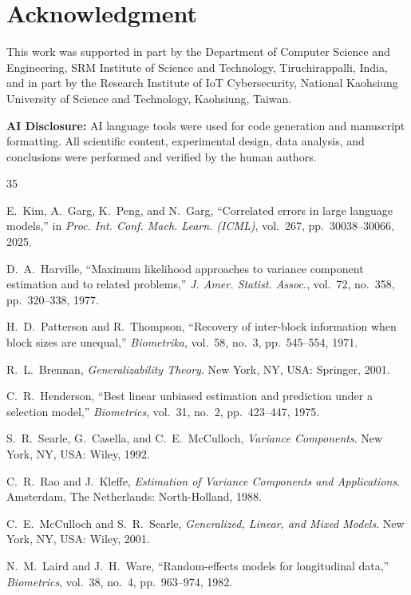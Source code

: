 \documentclass{ieeeaccess}
\theoremstyle{definition}
\theoremstyle{plain}
\begin{document}
\section*{Acknowledgment}
This work was supported in part by the Department of Computer Science and Engineering, SRM Institute of Science and Technology, Tiruchirappalli, India, and in part by the Research Institute of IoT Cybersecurity, National Kaohsiung University of Science and Technology, Kaohsiung, Taiwan.

\textbf{AI Disclosure:} AI language tools were used for code generation and manuscript formatting. All scientific content, experimental design, data analysis, and conclusions were performed and verified by the human authors.

\begin{thebibliography}{35}

 E.~Kim, A.~Garg, K.~Peng, and N.~Garg, ``Correlated errors in
large language models,'' in \emph{Proc. Int. Conf. Mach. Learn. (ICML)},
vol.~267, pp.~30038--30066, 2025.

 D.~A.~Harville, ``Maximum likelihood approaches to variance
component estimation and to related problems,'' \emph{J. Amer. Statist. Assoc.},
vol.~72, no.~358, pp.~320--338, 1977.

 H.~D.~Patterson and R.~Thompson, ``Recovery of
inter-block information when block sizes are unequal,'' \emph{Biometrika},
vol.~58, no.~3, pp.~545--554, 1971.

 R.~L.~Brennan, \emph{Generalizability Theory}. New York, NY,
USA: Springer, 2001.

 C.~R.~Henderson, ``Best linear unbiased estimation and
prediction under a selection model,'' \emph{Biometrics}, vol.~31, no.~2,
pp.~423--447, 1975.

 S.~R.~Searle, G.~Casella, and C.~E.~McCulloch,
\emph{Variance Components}. New York, NY, USA: Wiley, 1992.

 C.~R.~Rao and J.~Kleffe, \emph{Estimation of Variance
Components and Applications}. Amsterdam, The Netherlands: North-Holland, 1988.

 C.~E.~McCulloch and S.~R.~Searle, \emph{Generalized,
Linear, and Mixed Models}. New York, NY, USA: Wiley, 2001.

 N.~M.~Laird and J.~H.~Ware, ``Random-effects models for
longitudinal data,'' \emph{Biometrics}, vol.~38, no.~4, pp.~963--974, 1982.


\end{thebibliography}
\end{document}
